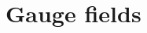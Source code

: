 \documentclass[11pt,twoside]{report}
\begin{document}
\setcounter{chapter}{5}

\chapter{Gauge fields}
\label{chap:lec5}

\end{document}
